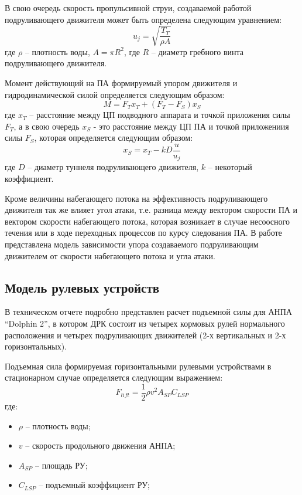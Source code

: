 В свою очередь скорость пропульсивной струи, создаваемой работой подруливающего движителя может быть определена следующим уравнением:
\begin{equation*}
	u_j = \sqrt{\frac{T_T}{\rho A}}
\end{equation*}
\noindent где $\rho$ -- плотность воды, $A=\pi R^2$, где $R$ -- диаметр гребного винта подруливающего движителя.

Момент действующий на ПА формируемый упором движителя и гидродинамической силой определяется следующим образом:
\begin{equation*}
	M = F_T x_T + (F_T-F_S)x_S
\end{equation*}
\noindent где $x_T$ -- расстояние между ЦП подводного аппарата и точкой приложения силы $F_T$, а в свою очередь $x_S$ - это расстояние между ЦП ПА и точкой приложениия силы $F_S$, которая определяется следующим образом:
\begin{equation*}
	x_S = x_T - kD\frac{u}{u_j}
\end{equation*}
\noindent где $D$ -- диаметр туннеля подруливающего движителя, $k$ -- некоторый коэффициент.

Кроме величины набегающего потока на эффективность подруливающего движителя так же влияет угол атаки, т.е. разница между вектором скорости ПА и вектором скорости набегающего потока, которая возникает в случае несоосного течения или в ходе переходных процессов по курсу следования ПА.
В работе \cite{palmer2008modelling} представлена модель зависимости упора создаваемого подруливающим движителем от скорости набегающего потока и угла атаки.

\subsection{Модель рулевых устройств}
В техническом отчете \cite{steenson2011control} подробно представлен расчет подъемной силы для АНПА ``Dolphin 2'', в котором ДРК состоит из четырех кормовых рулей нормального расположения и четырех подруливающих движителей (2-х вертикальных и 2-х горизонтальных).

Подъемная сила формируемая горизонтальными рулевыми устройствами в стационарном случае определяется следующим выражением:
\begin{equation}
    F_{lift} = \frac{1}{2}\rho v^2 A_{SP} C_{LSP}
\end{equation}
\noindent где:
\begin{itemize}
    \item $\rho$ -- плотность воды;
    \item $v$ -- скорость продольного движения АНПА;
    \item $A_{SP}$ -- площадь РУ;
    \item $C_{LSP}$ -- подъемный коэффициент РУ;
\end{itemize}

